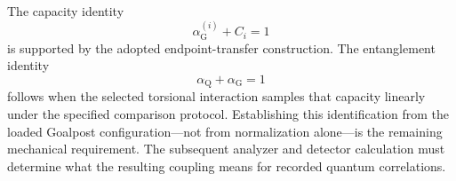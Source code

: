 The capacity identity
\begin{equation}
    \boxed{\alpha_{\mathrm G}^{(i)}+C_i=1}
\end{equation}
is supported by the adopted endpoint-transfer construction. The entanglement identity
\begin{equation}
    \boxed{\alpha_{\mathrm Q}+\alpha_{\mathrm G}=1}
\end{equation}
follows when the selected torsional interaction samples that capacity linearly under the specified comparison protocol. Establishing this identification from the loaded Goalpost configuration---not from normalization alone---is the remaining mechanical requirement. The subsequent analyzer and detector calculation must determine what the resulting coupling means for recorded quantum correlations.
